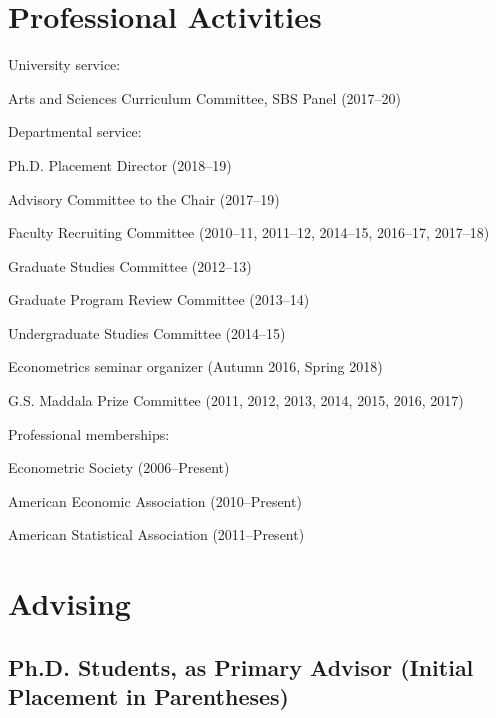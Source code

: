 \documentclass[10pt,letterpaper]{article}
\renewenvironment{itemize}{
  \begin{list}{}{
      \setlength{\leftmargin}{1.5em}
      \setlength{\itemsep}{0.25em}
      \setlength{\parskip}{0pt}
      \setlength{\parsep}{0.25em}
    }
}{
  \end{list}
}
\begin{document}
\section*{Professional Activities}

\begin{itemize}
\item University service:
  \begin{itemize}
  \item Arts and Sciences Curriculum Committee, SBS Panel (2017--20)
  \end{itemize}
\item Departmental service:
  \begin{itemize}
  \item Ph.D. Placement Director (2018--19)
  \item Advisory Committee to the Chair (2017--19)
  \item Faculty Recruiting Committee (2010--11, 2011--12, 2014--15, 2016--17, 2017--18)
  \item Graduate Studies Committee (2012--13)
  \item Graduate Program Review Committee (2013--14)
  \item Undergraduate Studies Committee (2014--15)
  \item Econometrics seminar organizer (Autumn 2016, Spring 2018)
  \item G.S. Maddala Prize Committee (2011, 2012, 2013, 2014, 2015, 2016, 2017)
  \end{itemize}
\item Professional memberships:
  \begin{itemize}
  \item Econometric Society (2006--Present)
  \item American Economic Association (2010--Present)
  \item American Statistical Association (2011--Present)
  \end{itemize}
\end{itemize}

\section*{Advising}

\subsection*{Ph.D. Students, as Primary Advisor (Initial Placement in Parentheses)}
\end{document}
